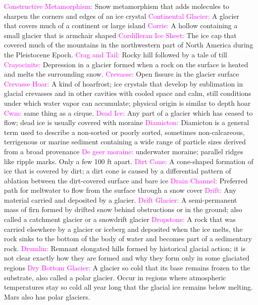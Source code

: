 \documentclass{article}
\newcommand{\pink}[1]{\textcolor{magenta}{#1}}
\newcommand{\vocab}[1]{{\pink{#1}}}
\begin{document}
\begin{multicols*}{4}
		\vocab{        Constructive Metamorphism: } Snow metamorphism that adds molecules to sharpen the corners and edges of an ice crystal 
		\vocab{ Continental Glacier: }A glacier that covers much of a continent or large island  
		\vocab{Corrie: } A hollow containing a small glacier that is armchair shaped  
		\vocab{Cordilleran Ice Sheet: }The ice cap that covered much of the mountains in the northwestern part of North America during the Pleistocene Epoch.  
		\vocab{Crag and Tail: }Rocky hill followed by a tale of till 
		\vocab{Crayocinite: }Depression in a glacier formed when a rock on the surface is heated and melts the surrounding snow. 
		\vocab{        Crevasse: } Open fissure in the glacier surface 
		\vocab{        Crevasse Hoar: } A kind of hoarfrost; ice crystals that develop by sublimation in glacial crevasses and in other cavities with cooled space and calm, still conditions under which water vapor can accumulate; physical origin is similar to depth hoar 
		\vocab{Cwm:} same thing as a cirque.
		\vocab{        Dead Ice: } Any part of a glacier which has ceased to flow; dead ice is usually covered with moraine 
		\vocab{Diamicton: } Diamicton is a general term used to describe a non-sorted or poorly sorted, sometimes non-calcareous, terrigenous or marine sediment containing a wide range of particle sizes derived from a broad provenance  
		\vocab{De geer moraine: } underwater moraine; parallel ridges like ripple marks. Only a few 100 ft apart. 
		\vocab{        Dirt Cone: } A cone-shaped formation of ice that is covered by dirt; a dirt cone is caused by a differential pattern of ablation between the dirt-covered surface and bare ice 
		\vocab{        Drain Channel: } Preferred path for meltwater to flow from the surface through a snow cover 
		\vocab{Drift: } Any material carried and deposited by a glacier.
		\vocab{        Drift Glacier: } A semi-permanent mass of firn formed by drifted snow behind obstructions or in the ground; also called a catchment glacier or a snowdrift glacier 
		\vocab{Dropstone: } A rock that was carried elsewhere by a glacier or iceberg and deposited when the ice melts, the rock sinks to the bottom of the body of water and becomes part of a sedimentary rock. 
		\vocab{        Drumlin: } Remnant elongated hills formed by historical glacial action; it is not clear exactly how they are formed and why they form only in some glaciated regions 
		\vocab{Dry Bottom Glacier: } A glacier so cold that its base remains frozen to the substrate, also called a polar glacier. Occur in regions where atmospheric temperatures stay so cold all year long that the glacial ice remains below melting. Mars also has polar glaciers.  

\end{multicols*}
\end{document}
